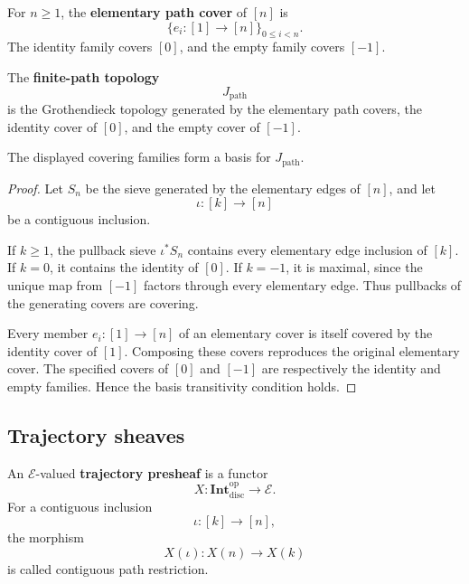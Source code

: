 \begin{definition}
\label{def:elementary-path-covers}
For \(n\geq1\), the \textbf{elementary path cover} of \([n]\) is
\[
    \{e_i:[1]\to[n]\}_{0\leq i<n}.
\]
The identity family covers \([0]\), and the empty family covers \([-1]\).
\end{definition}

\begin{definition}
\label{def:finite-path-topology}
The \textbf{finite-path topology}
\[
    J_{\mathrm{path}}
\]
is the Grothendieck topology generated by the elementary path covers, the
identity cover of \([0]\), and the empty cover of \([-1]\).
\end{definition}

\begin{proposition}
\label{prop:path-covers-form-basis}
The displayed covering families form a basis for
\(J_{\mathrm{path}}\).
\end{proposition}

\begin{proof}
Let \(S_n\) be the sieve generated by the elementary edges of \([n]\), and
let
\[
    \iota:[k]\to[n]
\]
be a contiguous inclusion.

If \(k\geq1\), the pullback sieve \(\iota^\ast S_n\) contains every
elementary edge inclusion of \([k]\). If \(k=0\), it contains the identity
of \([0]\). If \(k=-1\), it is maximal, since the unique map from
\([-1]\) factors through every elementary edge. Thus pullbacks of the
generating covers are covering.

Every member \(e_i:[1]\to[n]\) of an elementary cover is itself covered by
the identity cover of \([1]\). Composing these covers reproduces the
original elementary cover. The specified covers of \([0]\) and \([-1]\)
are respectively the identity and empty families. Hence the basis
transitivity condition holds.
\end{proof}

\subsection{Trajectory sheaves}
\label{subsec:trajectory-sheaves}

\begin{definition}
\label{def:trajectory-presheaf}
An \(\mathcal E\)-valued \textbf{trajectory presheaf} is a functor
\[
    X:
    \mathbf{Int}_{\mathrm{disc}}^{\mathrm{op}}
    \to
    \mathcal E.
\]
For a contiguous inclusion
\[
    \iota:[k]\to[n],
\]
the morphism
\[
    X(\iota):X(n)\to X(k)
\]
is called contiguous path restriction.
\end{definition}

